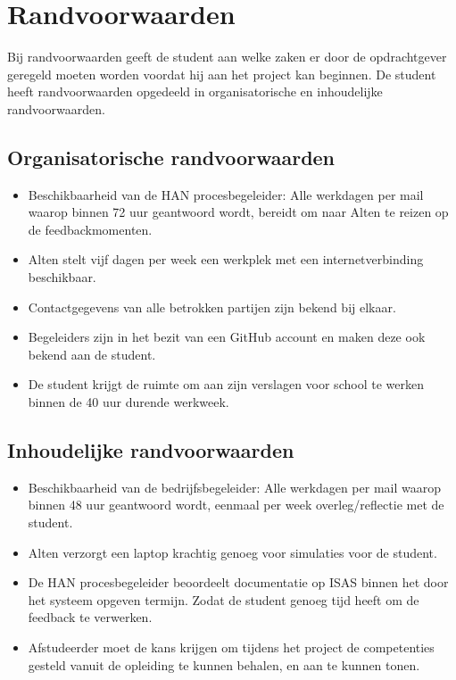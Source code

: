 \documentclass[a4paper, 11pt, oneside]{report}
\begin{document}
\chapter{Randvoorwaarden}
\label{chapter:randvoorwaarden}
Bij randvoorwaarden geeft de student aan welke zaken er door de opdrachtgever geregeld moeten worden voordat hij aan het project kan beginnen. De student heeft randvoorwaarden opgedeeld in organisatorische en inhoudelijke randvoorwaarden. 

\section{Organisatorische randvoorwaarden}
\begin{itemize}
	\item Beschikbaarheid van de HAN procesbegeleider: Alle werkdagen per mail waarop binnen 72 uur geantwoord wordt, bereidt om naar Alten te reizen op de feedbackmomenten.
	\item Alten stelt vijf dagen per week een werkplek met een internetverbinding beschikbaar.
	\item Contactgegevens van alle betrokken partijen zijn bekend bij elkaar.
	\item Begeleiders zijn in het bezit van een GitHub account en maken deze ook bekend aan de student.
	\item De student krijgt de ruimte om aan zijn verslagen voor school te werken binnen de 40 uur durende werkweek.
	
\end{itemize}
\section{Inhoudelijke randvoorwaarden}
\begin{itemize}
	\item Beschikbaarheid van de bedrijfsbegeleider: Alle werkdagen per mail waarop binnen 48 uur geantwoord wordt, eenmaal per week overleg/reflectie met de student.
	\item Alten verzorgt een laptop krachtig genoeg voor simulaties voor de student.
	\item De HAN procesbegeleider beoordeelt documentatie op ISAS binnen het door het systeem opgeven termijn. Zodat de student genoeg tijd heeft om de feedback te verwerken.
	\item Afstudeerder moet de kans krijgen om tijdens het project de competenties gesteld vanuit de
	opleiding te kunnen behalen, en aan te kunnen tonen.
\end{itemize}
\end{document}
